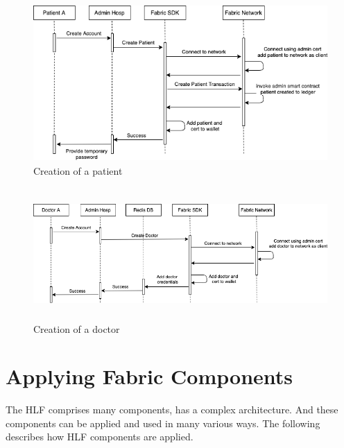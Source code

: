 \begin{figure}[htbp]
 \centering
 \includegraphics[height=6cm]{gfx/figures/first.png}
 \caption{Creation of a patient}
 \label{fig:chapter03:activityFirst}
\end{figure}

\begin{figure}[htbp]
 \centering
 \includegraphics[height=5cm]{gfx/figures/second.png}
 \caption{Creation of a doctor}
 \label{fig:chapter03:activitySecond}
\end{figure}


\section{Applying Fabric Components}
\label{sec:thesolution:fabriccomponents}
The HLF comprises many components, has a complex architecture. And these components can be applied and used in many various ways. The following describes how HLF components are applied.

